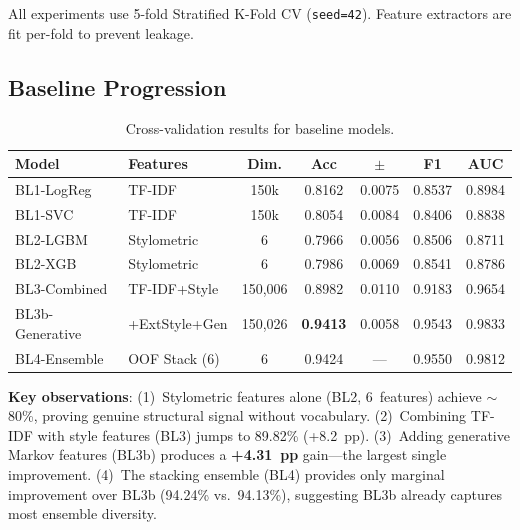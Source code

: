 \documentclass[11pt]{article}
\begin{document}
All experiments use 5-fold Stratified K-Fold CV (\texttt{seed=42}). Feature extractors are fit per-fold to prevent leakage.

\subsection{Baseline Progression}


\begin{table}[h!]
\centering
\caption{Cross-validation results for baseline models.}
\label{tab:baselines}
\small
\begin{tabular}{@{}llccccc@{}}
\toprule
\textbf{Model} & \textbf{Features} & \textbf{Dim.} & \textbf{Acc} & $\pm$ & \textbf{F1} & \textbf{AUC} \\
\midrule
BL1-LogReg & TF-IDF & 150k & 0.8162 & 0.0075 & 0.8537 & 0.8984 \\
BL1-SVC & TF-IDF & 150k & 0.8054 & 0.0084 & 0.8406 & 0.8838 \\
BL2-LGBM & Stylometric & 6 & 0.7966 & 0.0056 & 0.8506 & 0.8711 \\
BL2-XGB & Stylometric & 6 & 0.7986 & 0.0069 & 0.8541 & 0.8786 \\
BL3-Combined & TF-IDF+Style & 150,006 & 0.8982 & 0.0110 & 0.9183 & 0.9654 \\
BL3b-Generative & +ExtStyle+Gen & 150,026 & \textbf{0.9413} & 0.0058 & 0.9543 & 0.9833 \\
BL4-Ensemble & OOF Stack (6) & 6 & 0.9424 & --- & 0.9550 & 0.9812 \\
\bottomrule
\end{tabular}
\end{table}

\textbf{Key observations}: (1)~Stylometric features alone (BL2, 6~features) achieve ${\sim}$80\%, proving genuine structural signal without vocabulary. (2)~Combining TF-IDF with style features (BL3) jumps to 89.82\% (+8.2~pp). (3)~Adding generative Markov features (BL3b) produces a \textbf{+4.31~pp} gain---the largest single improvement. (4)~The stacking ensemble (BL4) provides only marginal improvement over BL3b (94.24\% vs.\ 94.13\%), suggesting BL3b already captures most ensemble diversity.
\end{document}
